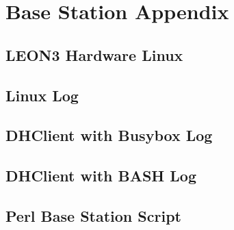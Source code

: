 \section{Base Station Appendix}
\subsection{LEON3 Hardware Linux}
\begin{spacing}{1}

\end{spacing}
\newpage
\subsection{Linux Log}
\begin{spacing}{1}

\end{spacing}
\newpage
\subsection{DHClient with Busybox Log}
\begin{spacing}{1}

\end{spacing}
\newpage
\subsection{DHClient with BASH Log}
\begin{spacing}{1}

\end{spacing}
\subsection{Perl Base Station Script}
